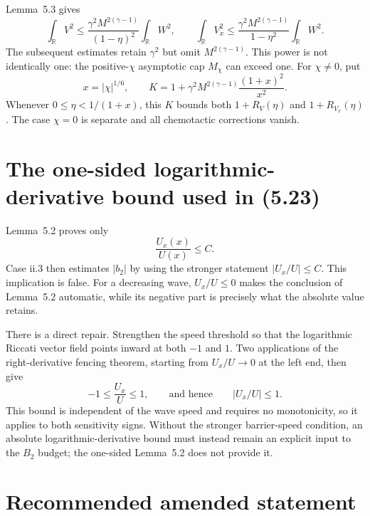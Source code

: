 \documentclass[11pt]{article}
\newcommand{\R}{\mathbb{R}}
\newcommand{\abs}[1]{\left\lvert #1\right\rvert}
\begin{document}
Lemma~5.3 gives
\[
 \int_{\R}V^2\leq
 \frac{\gamma^2M^{2(\gamma-1)}}{(1-\eta)^2}\int_{\R}W^2,
 \qquad
 \int_{\R}V_x^2\leq
 \frac{\gamma^2M^{2(\gamma-1)}}{1-\eta^2}\int_{\R}W^2.
\]
The subsequent estimates retain $\gamma^2$ but omit
$M^{2(\gamma-1)}$.  This power is not identically one: the positive-$\chi$
asymptotic cap $M_\chi$ can exceed one.  For $\chi\neq0$, put
\[
 x=\abs{\chi}^{1/6},\qquad
 K=1+\gamma^2M^{2(\gamma-1)}\frac{(1+x)^2}{x^2}.
\]
Whenever $0\leq\eta<1/(1+x)$, this $K$ bounds both $1+R_V(\eta)$
and $1+R_{V_x}(\eta)$.  The case $\chi=0$ is separate and all
chemotactic corrections vanish.

\section{The one-sided logarithmic-derivative bound used in (5.23)}

Lemma~5.2 proves only
\[
  \frac{U_x(x)}{U(x)}\leq C.
\]
Case ii.3 then estimates $\abs{b_2}$ by using the stronger statement
$\abs{U_x/U}\leq C$.  This implication is false.  For a decreasing wave,
$U_x/U\leq0$ makes the conclusion of Lemma~5.2 automatic, while its negative
part is precisely what the absolute value retains.

There is a direct repair.  Strengthen the speed threshold so that the
logarithmic Riccati vector field points inward at both $-1$ and $1$.
Two applications of the right-derivative fencing theorem, starting from
$U_x/U\to0$ at the left end, then give
\[
  -1\leq \frac{U_x}{U}\leq1,
  \qquad \text{and hence}\qquad
  \abs{U_x/U}\leq1.
\]
This bound is independent of the wave speed and requires no monotonicity, so
it applies to both sensitivity signs.  Without the stronger barrier-speed
condition, an absolute logarithmic-derivative bound must instead remain an
explicit input to the $B_2$ budget; the one-sided Lemma~5.2 does not provide
it.

\section{Recommended amended statement}
\end{document}

